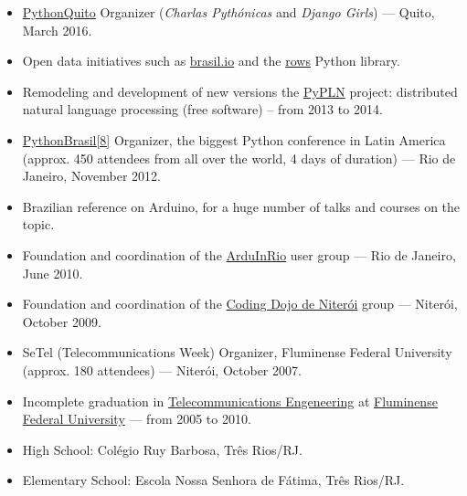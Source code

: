 \documentclass[a4paper,11pt]{article}
\begin{document}
	\begin{itemize}
		\item \href{http://pythonquito.tk}{PythonQuito} Organizer
			(\textit{Charlas Pythónicas} and \textit{Django Girls}) --- Quito,
			March 2016.
		\item Open data initiatives such as \href{http://brasil.io/}{brasil.io}
			and the \href{https://github.com/turicas/rows}{rows} Python
			library.
		\item Remodeling and development of new versions the
			\href{http://pypln.org/}{PyPLN} project: distributed natural
			language processing (free software) -- from 2013 to 2014.
		\item \href{http://2012.pythonbrasil.org.br/}{PythonBrasil[8]}
			Organizer, the biggest Python conference in Latin America (approx.
			450 attendees from all over the world, 4 days of duration) --- Rio
			de Janeiro, November 2012.
		\item Brazilian reference on Arduino, for a huge number of talks and
			courses on the topic.
		\item Foundation and coordination of the
			\href{https://groups.google.com/forum/#!forum/arduinrio}{ArduInRio}
			user group --- Rio de Janeiro, June 2010.
		\item Foundation and coordination of the
			\href{http://dojorio.org}{Coding Dojo de Niterói} group ---
			Niterói, October 2009.
		\item SeTel (Telecommunications Week) Organizer, Fluminense Federal
			University (approx. 180 attendees) --- Niterói, October 2007.
	 \end{itemize}


	\begin{itemize}
		\item Incomplete graduation in
			\href{http://telecom.uff.br/}{Telecommunications Engeneering} at
			\href{http://www.uff.br/}{Fluminense Federal University} ---
			from 2005 to 2010.
		\item High School: Colégio Ruy Barbosa, Três Rios/RJ.
		\item Elementary School: Escola Nossa Senhora de Fátima, Três Rios/RJ.
	 \end{itemize}
\end{document}

